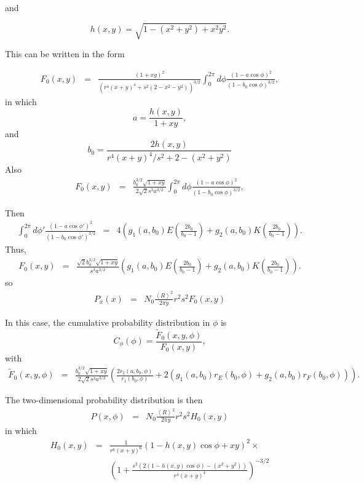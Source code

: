 \documentclass[11pt]{article}
\begin{document}
{{{{and

$$h(x,y)=\sqrt{1-(x^{2}+y^{2})+x^{2}y^{2}}.$$

This can be written in the form

\begin{eqnarray} F_{0}(x,y)&=&\frac{(1+xy)^{2}}{\left(r^{4}(x+y)^{4}+s^{2}(2-x^{2}-y^{2})\right)^{3/2}}\int_{0}^{2\pi}d\phi\frac{\left(1-a\cos\phi \right)^{2}}{(1-b_0\cos\phi)^{3/2}},
\end{eqnarray}
in which 
$$a=\frac{h(x,y)}{1+xy},$$
and
$$b_0=\frac{2h(x,y)}{r^{4}(x+y)^{4}/s^{2}+2-(x^{2}+y^{2})}$$
Also
\begin{eqnarray} F_{0}(x,y)&=&\frac{b_{0}^{3/2}\sqrt{1+xy}}{2\sqrt{2}s^{3}a^{3/2}}\int_{0}^{2\pi}d\phi\frac{\left(1-a\cos\phi \right)^{2}}{(1-b_0\cos\phi)^{3/2}},
\end{eqnarray}

Then
\begin{eqnarray}
\int_{0}^{2\pi}d\phi'\frac{\left(1-a\cos\phi' \right)^{2}}{(1-b_0\cos\phi')^{3/2}}&=&
4\left(g_{1}(a,b_0)E\left(\frac{2b_0}{b_0-1}\right)+g_{2}(a,b_0)K\left(\frac{2b_0}{b_0-1}\right)\right).
\end{eqnarray}
Thus, 
\begin{eqnarray} F_{0}(x,y)&=&\frac{\sqrt{2}b_{0}^{3/2}\sqrt{1+xy}}{s^{3}a^{3/2}}\left(g_{1}(a,b_0)E\left(\frac{2b_0}{b_0-1}\right)+g_{2}(a,b_0)K\left(\frac{2b_0}{b_0-1}\right)\right).
\end{eqnarray}
so
\begin{eqnarray}
P_{x}(x)&=&N_{0}\frac{\left<R\right>^{2}}{2\pi y}
r^{2}s^{2}
F_{0}(x,y)
\end{eqnarray}

In this case, the cumulative probability distribution in $\phi$ is 
  $$C_{\phi}(\phi)=\frac{\tilde F_{0}(x,y,\phi)}{ F_{0}(x,y)},$$
with
\begin{eqnarray}
\tilde F_{0}(x,y,\phi)&=&\frac{b_{0}^{3/2}\sqrt{1+xy}}{2\sqrt{2}s^{3}a^{3/2}}\left(
\frac{2r_{2}(a,b_0,\phi)}{r_{1}(b_0,\phi)}+2(g_{1}(a,b_0)r_{E}(b_0,\phi)+g_{2}(a,b_0)r_{F}(b_0,\phi))\right).
\end{eqnarray}

The two-dimensional probability distribution is then
\begin{eqnarray}
P(x,\phi)&=&N_{0}\frac{\left<R\right>^{2}}{2\pi y}
r^{2}s^{2}
H_{0}(x,y)
\end{eqnarray}
in which
\begin{eqnarray} H_{0}(x,y)&=&\frac{1}{r^{6}(x+y)^{6}}\left(1-h(x,y)\cos\phi +xy\right)^{2}\times\\
&&\left(1+\frac{s^{2}\left(2(1-h(x,y)\cos\phi) -(x^{2}+y^{2})\right)}{r^{4}(x+y)^{4}}\right)^{-3/2}
\end{eqnarray}

}}}}
\end{document}
